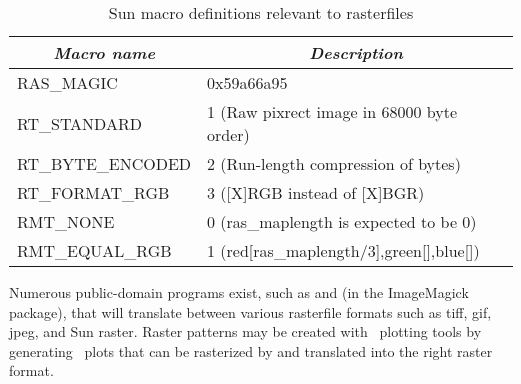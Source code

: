 \begin{table}[H]
\centering
\begin{tabular}{|l|l|}	\hline

\multicolumn{1}{|c}{\emph{Macro name}}	&	\multicolumn{1}{|c|}{\emph{Description}}	\\ \hline
RAS\_MAGIC	&	0x59a66a95  \\ \hline
RT\_STANDARD	&	1 (Raw pixrect image in 68000 byte order)  \\ \hline
RT\_BYTE\_ENCODED	&	2 (Run-length compression of bytes)  \\ \hline
RT\_FORMAT\_RGB	&	3 ([X]RGB instead of [X]BGR)  \\ \hline
RMT\_NONE	&	0 (ras\_maplength is expected to be 0)  \\ \hline
RMT\_EQUAL\_RGB	&	1 (red[ras\_maplength/3],green[],blue[])  \\ \hline

\end{tabular}

\caption{Sun macro definitions relevant to rasterfiles}
\label{tbl:sundef}
\end{table} 

Numerous public-domain programs exist, such as  and
 (in the ImageMagick package), that will translate
between various rasterfile formats such as tiff, gif, jpeg, and
Sun raster.  Raster patterns may be created with \GMT\ plotting
tools by generating \PS\ plots that can be rasterized
by  and translated into the right raster format.
